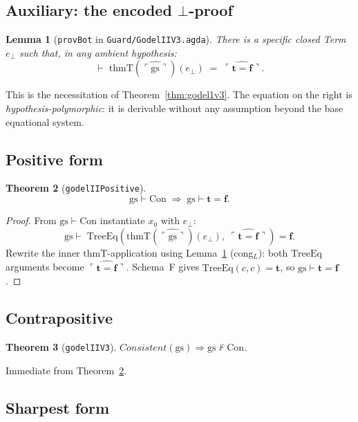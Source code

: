 \documentclass[11pt]{article}
\newtheorem{theorem}{Theorem}
\newtheorem{lemma}[theorem]{Lemma}
\newcommand{\trueT}{\mathbf{t}}
\newcommand{\falseT}{\mathbf{f}}
\newcommand{\code}[1]{\ulcorner #1 \urcorner}
\newcommand{\reify}[1]{\widehat{#1}}
\newcommand{\thmT}{\mathrm{thmT}}
\newcommand{\TreeEq}{\mathrm{TreeEq}}
\begin{document}
\subsection{Auxiliary: the encoded $\bot$-proof}

\begin{lemma}[\texttt{provBot} in \texttt{Guard/GodelIIV3.agda}]
\label{lem:provbot}
There is a specific closed Term $e_\bot$ such that, in any ambient
hypothesis:
\[
  \vdash\; \thmT(\reify{\code{\mathrm{gs}}})(e_\bot) \;=\;
    \reify{\code{\trueT = \falseT}}.
\]
\end{lemma}

This is the necessitation of Theorem~\ref{thm:godel1v3}.  The
equation on the right is \emph{hypothesis-polymorphic}: it is
derivable without any assumption beyond the base equational system.

\subsection{Positive form}

\begin{theorem}[\texttt{godelIIPositive}]
\label{thm:g2pos}
\[
  \mathrm{gs} \vdash \mathrm{Con} \;\Longrightarrow\; \mathrm{gs} \vdash \trueT = \falseT.
\]
\end{theorem}

\begin{proof}
From $\mathrm{gs} \vdash \mathrm{Con}$ instantiate $x_0$ with $e_\bot$:
\[
  \mathrm{gs} \vdash\;
  \TreeEq(\thmT(\reify{\code{\mathrm{gs}}})(e_\bot),\;
          \reify{\code{\trueT = \falseT}}) = \falseT.
\]
Rewrite the inner $\thmT$-application using Lemma~\ref{lem:provbot}
(cong$_L$): both $\TreeEq$ arguments become
$\reify{\code{\trueT = \falseT}}$.  Schema~F gives
$\TreeEq(c, c) = \trueT$, so $\mathrm{gs} \vdash \trueT = \falseT$.
\end{proof}

\subsection{Contrapositive}

\begin{theorem}[\texttt{godelIIV3}]
$\mathit{Consistent}(\mathrm{gs}) \Longrightarrow \mathrm{gs} \not\vdash \mathrm{Con}$.
\end{theorem}

Immediate from Theorem~\ref{thm:g2pos}.

\subsection{Sharpest form}
\end{document}
